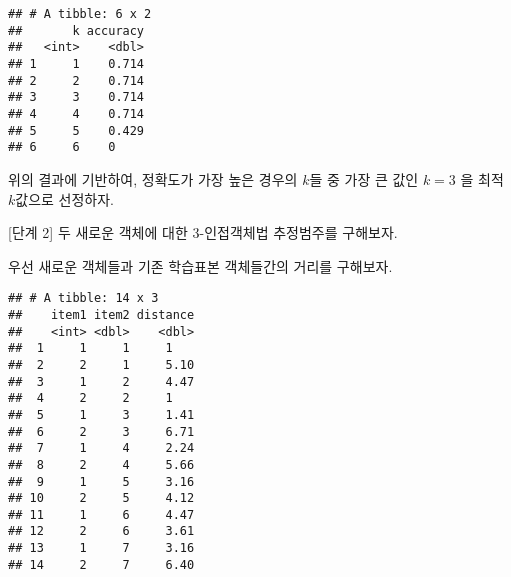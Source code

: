 \documentclass[]{book}
\newenvironment{Shaded}{\begin{snugshade}}{\end{snugshade}}
\newcommand{\DataTypeTok}[1]{\textcolor[rgb]{0.13,0.29,0.53}{#1}}
\newcommand{\DecValTok}[1]{\textcolor[rgb]{0.00,0.00,0.81}{#1}}
\newcommand{\KeywordTok}[1]{\textcolor[rgb]{0.13,0.29,0.53}{\textbf{#1}}}
\newcommand{\NormalTok}[1]{#1}
\newcommand{\OperatorTok}[1]{\textcolor[rgb]{0.81,0.36,0.00}{\textbf{#1}}}
\newcommand{\StringTok}[1]{\textcolor[rgb]{0.31,0.60,0.02}{#1}}
\begin{document}
\begin{verbatim}
## # A tibble: 6 x 2
##       k accuracy
##   <int>    <dbl>
## 1     1    0.714
## 2     2    0.714
## 3     3    0.714
## 4     4    0.714
## 5     5    0.429
## 6     6    0
\end{verbatim}

위의 결과에 기반하여, 정확도가 가장 높은 경우의 \(k\)들 중 가장 큰 값인 \(k = 3\) 을 최적 \(k\)값으로 선정하자.

{[}단계 2{]} 두 새로운 객체에 대한 3-인접객체법 추정범주를 구해보자.

우선 새로운 객체들과 기존 학습표본 객체들간의 거리를 구해보자.

\begin{Shaded}
\end{Shaded}

\begin{verbatim}
## # A tibble: 14 x 3
##    item1 item2 distance
##    <int> <dbl>    <dbl>
##  1     1     1     1   
##  2     2     1     5.10
##  3     1     2     4.47
##  4     2     2     1   
##  5     1     3     1.41
##  6     2     3     6.71
##  7     1     4     2.24
##  8     2     4     5.66
##  9     1     5     3.16
## 10     2     5     4.12
## 11     1     6     4.47
## 12     2     6     3.61
## 13     1     7     3.16
## 14     2     7     6.40
\end{verbatim}
\end{document}
